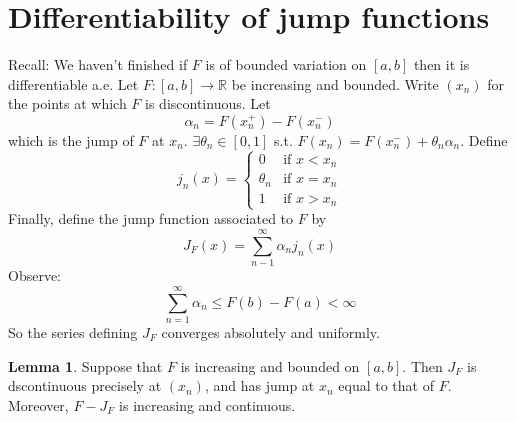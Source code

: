\documentclass{article}
\theoremstyle{definition}
\theoremstyle{definition}
\newtheorem{lem}{Lemma}
\begin{document}
\section{Differentiability of jump functions}

Recall: We haven't finished if $F$ is of bounded variation on $[a, b]$ then it is differentiable a.e. Let $F:[a, b] \to \mathbb{R}$ be increasing and bounded. Write $(x_n)$ for the points at which $F$ is discontinuous. Let
\[
  \alpha_n = F(x_n^+) - F(x_n^-)
\]
which is the jump of $F$ at $x_n$. $\exists \theta_n \in [0,1]$ s.t. $F(x_n) = F(x_n^-) + \theta_n \alpha_n$. Define 
\[
  j_n(x) = 
  \begin{cases}
    0 & \text{if } x < x_n\\
    \theta_n & \text{if } x = x_n\\
    1 & \text{if } x > x_n
  \end{cases}
\]
Finally, define the jump function associated to $F$ by 
\[
  J_F(x) = \sum_{n - 1}^\infty \alpha_n j_n(x)
\]
Observe:
\[
  \sum_{n = 1}^\infty \alpha_n \leq F(b) - F(a) < \infty
\]
So the series defining $J_F$ converges absolutely and uniformly. 
\begin{lem}
  Suppose that $F$ is increasing and bounded on $[a, b]$. Then $J_F$ is dscontinuous precisely at $(x_n)$, and has jump at $x_n$ equal to that of $F$. Moreover, $F - J_F$ is increasing and continuous. 
\end{lem}
\end{document}
